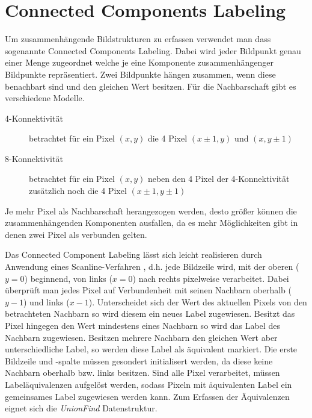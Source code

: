 \section*{Connected Components Labeling}
\writtenby{\dcauthornameewie}%
Um zusammenhängende Bildstrukturen zu erfassen verwendet man dass sogenannte Connected Components Labeling.
Dabei wird jeder Bildpunkt genau einer Menge zugeordnet welche je eine Komponente zusammenhängenger Bildpunkte repräsentiert.
Zwei Bildpunkte hängen zusammen, wenn diese benachbart sind und den gleichen Wert besitzen.
Für die Nachbarschaft gibt es verschiedene Modelle.

\begin{description}
\item[4-Konnektivität] betrachtet für ein Pixel $(x,y)$ die 4 Pixel $(x\pm1,y)$ und $(x,y\pm1)$
\item[8-Konnektivität] betrachtet für ein Pixel $(x,y)$ neben den 4 Pixel der 4-Konnektivität zusätzlich noch die 4 Pixel $(x\pm1,y\pm1)$
\end{description}
Je mehr Pixel als Nachbarschaft herangezogen werden, desto größer können die zusammenhängenden Komponenten ausfallen, da es mehr Möglichkeiten gibt in denen zwei Pixel als verbunden gelten.

Das Connected Component Labeling lässt sich leicht realisieren durch Anwendung eines Scanline-Verfahren \cite[69--75]{compvis2001}, d.h. jede Bildzeile wird, mit der oberen ($y=0$) beginnend, von links ($x=0$) nach rechts pixelweise verarbeitet.
Dabei überprüft man jedes Pixel auf Verbundenheit mit seinen Nachbarn oberhalb ($y-1$) und links ($x-1$).
Unterscheidet sich der Wert des aktuellen Pixels von den betrachteten Nachbarn so wird diesem ein neues Label zugewiesen.
Besitzt das Pixel hingegen den Wert mindestens eines Nachbarn so wird das Label des Nachbarn zugewiesen.
Besitzen mehrere Nachbarn den gleichen Wert aber unterschiedliche Label, so werden diese Label als äquivalent markiert.
Die erste Bildzeile und -spalte müssen gesondert initialisert werden, da diese keine Nachbarn oberhalb bzw. links besitzen.
Sind alle Pixel verarbeitet, müssen Labeläquivalenzen aufgelöst werden, sodass Pixeln mit äquivalenten Label ein gemeinsames Label zugewiesen werden kann. Zum Erfassen der Äquivalenzen eignet sich die \emph{UnionFind} Datenstruktur.
